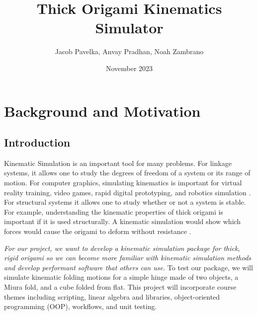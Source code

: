 \documentclass[letterpaper]{article}
\title{Thick Origami Kinematics Simulator}
\author{Jacob Pavelka, Anvay Pradhan, Noah Zambrano}
\date{November 2023}
\begin{document}


\maketitle

\section*{Background and Motivation}
\subsection*{Introduction}
Kinematic Simulation is an important tool for many problems. For linkage systems, it allows one to study the degrees of freedom of a system or its range of motion. For computer graphics, simulating kinematics is important for virtual reality training, video games, rapid digital prototyping, and robotics simulation \cite{SiggraphContact22}.
For structural systems it allows one to study whether or not a system is stable. For example, understanding the kinematic properties of thick origami is important if it is used structurally. A kinematic simulation would show which forces would cause the origami to deform without resistance \cite{filipov2015toward}. 

\textit{For our project, we want to develop a kinematic simulation package for thick, rigid origami so we can become more familiar with kinematic simulation methods and develop performant software that others can use.} To test our package, we will simulate kinematic folding motions for a simple hinge made of two objects, a Miura fold, and a cube folded from flat. This project will incorporate course themes including scripting, linear algebra and libraries, object-oriented programming (OOP), workflows, and unit testing.
\end{document}

